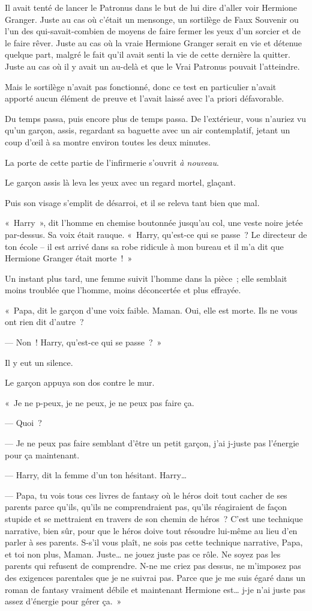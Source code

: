 Il avait tenté de lancer le Patronus dans le but de lui dire d'aller voir Hermione Granger. Juste au cas où c'était un mensonge, un sortilège de Faux Souvenir ou l'un des qui-savait-combien de moyens de faire fermer les yeux d'un sorcier et de le faire rêver. Juste au cas où la vraie Hermione Granger serait en vie et détenue quelque part, malgré le fait qu'il avait senti la vie de cette dernière la quitter. Juste au cas où il y avait un au-delà et que le Vrai Patronus pouvait l'atteindre.

Mais le sortilège n'avait pas fonctionné, donc ce test en particulier n'avait apporté aucun élément de preuve et l'avait laissé avec l'a priori défavorable.

Du temps passa, puis encore plus de temps passa. De l'extérieur, vous n'auriez vu qu'un garçon, assis, regardant sa baguette avec un air contemplatif, jetant un coup d'œil à sa montre environ toutes les deux minutes.

La porte de cette partie de l'infirmerie s'ouvrit \emph{à nouveau}.

Le garçon assis là leva les yeux avec un regard mortel, glaçant.

Puis son visage s'emplit de désarroi, et il se releva tant bien que mal.

«~Harry~», dit l'homme en chemise boutonnée jusqu'au col, une veste noire jetée par-dessus. Sa voix était rauque. «~Harry, qu'est-ce qui se passe~? Le directeur de ton école -- il est arrivé dans sa robe ridicule à mon bureau et il m'a dit que Hermione Granger était morte~!~»

Un instant plus tard, une femme suivit l'homme dans la pièce~; elle semblait moins troublée que l'homme, moins déconcertée et plus effrayée.

«~Papa, dit le garçon d'une voix faible. Maman. Oui, elle est morte. Ils ne vous ont rien dit d'autre~?

--- Non~! Harry, qu'est-ce qui se passe~?~»

Il y eut un silence.

Le garçon appuya son dos contre le mur.

«~Je ne p-peux, je ne peux, je ne peux pas faire ça.

--- Quoi~?

--- Je ne peux pas faire semblant d'être un petit garçon, j'ai j-juste pas l'énergie pour ça maintenant.

--- Harry, dit la femme d'un ton hésitant. Harry…

--- Papa, tu vois tous ces livres de fantasy où le héros doit tout cacher de ses parents parce qu'ils, qu'ils ne comprendraient pas, qu'ils réagiraient de façon stupide et se mettraient en travers de son chemin de héros~? C'est une technique narrative, bien sûr, pour que le héros doive tout résoudre lui-même au lieu d'en parler à ses parents. S-s'il vous plaît, ne sois pas cette technique narrative, Papa, et toi non plus, Maman. Juste… ne jouez juste pas ce rôle. Ne soyez pas les parents qui refusent de comprendre. N-ne me criez pas dessus, ne m'imposez pas des exigences parentales que je ne suivrai pas. Parce que je me suis égaré dans un roman de fantasy vraiment débile et maintenant Hermione est… j-je n'ai juste pas assez d'énergie pour gérer ça.~»

